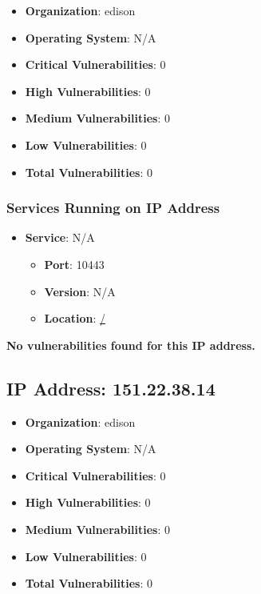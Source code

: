 \documentclass{article}
\begin{document}
\begin{itemize}
    \item \textbf{Organization}: edison
    \item \textbf{Operating System}:  N/A 
    \item \textbf{Critical Vulnerabilities}: 0
    \item \textbf{High Vulnerabilities}: 0
    \item \textbf{Medium Vulnerabilities}: 0
    \item \textbf{Low Vulnerabilities}: 0
    \item \textbf{Total Vulnerabilities}: 0
\end{itemize}

\subsubsection*{Services Running on IP Address}

\begin{itemize}
    
        \item \textbf{Service}: N/A
        \begin{itemize}
            \item \textbf{Port}: 10443
            \item \textbf{Version}:  N/A 
            \item \textbf{Location}: \href{ / }{ / }
        \end{itemize}
    
\end{itemize}


\textbf{No vulnerabilities found for this IP address.}




\clearpage



\subsection{IP Address: 151.22.38.14}

\begin{itemize}
    \item \textbf{Organization}: edison
    \item \textbf{Operating System}:  N/A 
    \item \textbf{Critical Vulnerabilities}: 0
    \item \textbf{High Vulnerabilities}: 0
    \item \textbf{Medium Vulnerabilities}: 0
    \item \textbf{Low Vulnerabilities}: 0
    \item \textbf{Total Vulnerabilities}: 0
\end{itemize}
\end{document}

